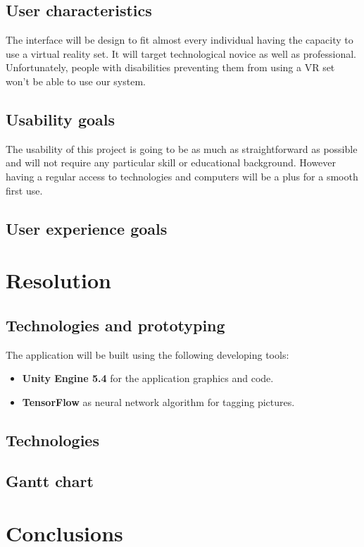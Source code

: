 \documentclass[11pt,a4paper]{article}
\begin{document}
\subsection{User characteristics}

The interface will be design to fit almost every individual having the capacity to use  a virtual reality set. It will target technological novice as well as professional. Unfortunately, people with disabilities preventing them from using a VR set won't be able to use our system.

\subsection{Usability goals}

The usability of this project is going to be as much as straightforward as possible and will not require any particular skill or educational background. However having a regular access to technologies and computers will be a plus for a smooth first use. 

\subsection{User experience goals}

\section{Resolution}

\subsection{Technologies and prototyping}

The application will be built using the following developing tools:
\begin{itemize}
\item \textbf{Unity Engine 5.4} for the application graphics and code.
\item \textbf{TensorFlow} as neural network algorithm for tagging pictures.
\end{itemize}

\subsection{Technologies}


\begin{landscape}
\section{Gantt chart}
\end{landscape}
\section{Conclusions}
\end{document}
